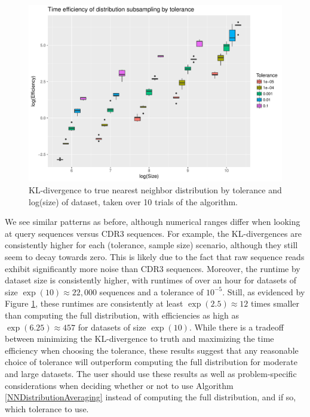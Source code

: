 \documentclass{article}
\begin{document}
\begin{figure}
    \includegraphics[width=\linewidth]{Figures/NearestNeighbor/efficiency_by_size_and_tol.pdf}
    \caption{KL-divergence to true nearest neighbor distribution by tolerance and log(size) of dataset, taken over 10 trials of the algorithm.}
    \label{fig:EfficiencyBySizeFull}
\end{figure}
We see similar patterns as before, although numerical ranges differ when looking at query sequences versus CDR3 sequences.
For example, the KL-divergences are consistently higher for each (tolerance, sample size) scenario, although they still seem to decay towards zero.
This is likely due to the fact that raw sequence reads exhibit significantly more noise than CDR3 sequences.
Moreover, the runtime by dataset size is consistently higher, with runtimes of over an hour for datasets of size $\exp(10) \approx 22,000$ sequences and a tolerance of $10^{-5}$. 
Still, as evidenced by Figure \ref{fig:EfficiencyBySizeFull}, these runtimes are consistently at least $\exp(2.5) \approx 12$ times smaller than computing the full distribution, with efficiencies as high as $\exp(6.25) \approx 457$ for datasets of size $\exp(10)$.
While there is a tradeoff between minimizing the KL-divergence to truth and maximizing the time efficiency when choosing the tolerance, these results suggest that any reasonable choice of tolerance will outperform computing the full distribution for moderate and large datasets.
The user should use these results as well as problem-specific considerations when deciding whether or not to use Algorithm \ref{NNDistributionAveraging} instead of computing the full distribution, and if so, which tolerance to use.
\end{document}
